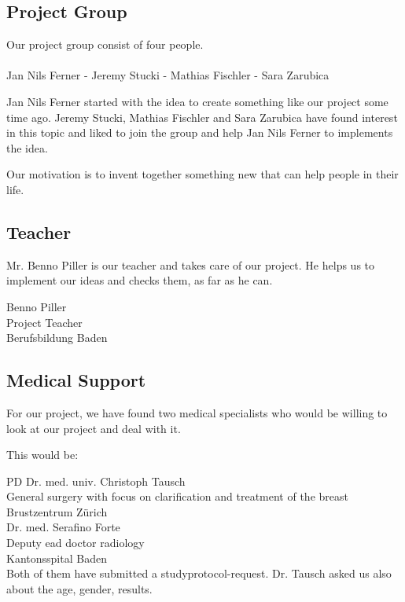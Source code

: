 \subsection{Project Group}
Our project group consist of four people.\\\\
Jan Nils Ferner - 
Jeremy Stucki - 
Mathias Fischler - 
Sara Zarubica

Jan Nils Ferner started with the idea to create something like our project some time ago.
Jeremy Stucki, Mathias Fischler and Sara Zarubica have found interest in this topic and liked to join the group and help Jan Nils Ferner to implements the idea.

Our motivation is to invent together something new that can help people in their life.

\subsection{Teacher}
Mr. Benno Piller is our teacher and takes care of our project.
He helps us to implement our ideas and checks them, as far as he can.

Benno Piller\\
Project Teacher\\
Berufsbildung Baden
\subsection{Medical Support}

For our project, we have found two medical specialists who would be willing to look at our project and deal with it.

This would be:

PD Dr. med. univ. Christoph Tausch\\
General surgery with focus on clarification and treatment of the breast\\
Brustzentrum Zürich\\


Dr. med. Serafino Forte\\
Deputy ead doctor radiology\\
Kantonsspital Baden\\

Both of them have submitted a studyprotocol-request.
Dr. Tausch asked us also about the age, gender, results.